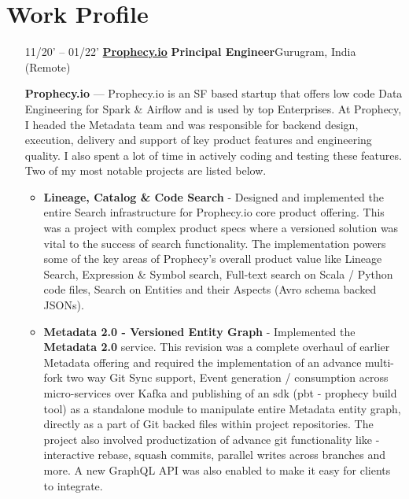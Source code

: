 \documentclass{article}
\begin{document}
\section{Work Profile}

\begin{itemize}[leftmargin=-1ex] \setlength\itemsep{0.25em}\vspace{5pt}

  \item[11/20' – 01/22'] \href{https://app.prophecy.io/}{\textbf{Prophecy.io}} \textbf{Principal Engineer}\hfill Gurugram, India (Remote)
	
	\item[]  \textbf{Prophecy.io} --- Prophecy.io is an SF based startup that offers low code Data Engineering for Spark \& Airflow and is used by top Enterprises. At Prophecy, I headed the Metadata team and was responsible for backend design, execution, delivery and support of key product features and engineering quality. I also spent a lot of time in actively coding and testing these features. Two of my most notable projects are listed below.  \vspace{5pt}
	\begin{itemize} \setlength\itemsep{0.5em}
		\item {\textbf{Lineage, Catalog \& Code Search}}  - Designed and implemented the entire Search infrastructure for Prophecy.io core product offering. This was a project with complex product specs where a versioned solution was vital to the success of search functionality. The implementation powers some of the key areas of Prophecy's overall product value like Lineage Search, Expression \& Symbol search, Full-text search on Scala / Python code files, Search on Entities and their Aspects (Avro schema backed JSONs). 
		\item {\textbf{Metadata 2.0 - Versioned Entity Graph}} - Implemented the \textbf{Metadata 2.0} service. This revision was a complete overhaul of earlier Metadata offering and required the implementation of an advance multi-fork two way Git Sync support, Event generation / consumption across micro-services over Kafka and publishing of an sdk (pbt - prophecy build tool) as a standalone module to manipulate entire Metadata entity graph, directly as a part of Git backed files within project repositories. The project also involved productization of advance git functionality like - interactive rebase, squash commits, parallel writes across branches and more. A new GraphQL API was also enabled to make it easy for clients to integrate.
		

\end{itemize}
\end{itemize}
\end{document}
